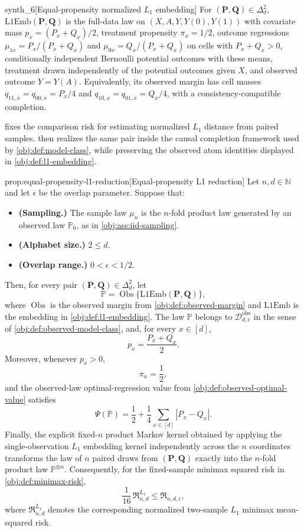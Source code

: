 \begin{definitionv}{synth_6}[Equal-propensity normalized \(L_1\) embedding]
For \((\mathbf P,\mathbf Q)\in\Delta_d^2\), \(\mathrm{L1Emb}(\mathbf P,\mathbf Q)\) is the full-data law on \((X,A,Y,Y(0),Y(1))\) with covariate mass \(p_x=(P_x+Q_x)/2\), treatment propensity \(\pi_x=1/2\), outcome regressions \(\mu_{1x}=P_x/(P_x+Q_x)\) and \(\mu_{0x}=Q_x/(P_x+Q_x)\) on cells with \(P_x+Q_x>0\), conditionally independent Bernoulli potential outcomes with these means, treatment drawn independently of the potential outcomes given \(X\), and observed outcome \(Y=Y(A)\). Equivalently, its observed margin has cell masses \(q_{11,x}=q_{00,x}=P_x/4\) and \(q_{10,x}=q_{01,x}=Q_x/4\), with a consistency-compatible completion.
\end{definitionv}

 fixes the comparison risk for estimating normalized \(L_1\) distance from paired samples.  then realizes the same pair inside the causal completion framework used by \cref{obj:def:model-class}, while preserving the observed atom identities displayed in \cref{obj:def:l1-embedding}.

\begin{propositionv}{prop:equal-propensity-l1-reduction}[Equal-propensity L1 reduction]
Let \(n,d\in\mathbb N\) and let \(\epsilon\) be the overlap parameter. Suppose that:
\begin{itemize}
\item \textbf{(Sampling.)} The sample law \(\mu_n\) is the \(n\)-fold product law generated by an observed law \(\mathbb P_0\), as in \cref{obj:ass:iid-sampling}.
\item \textbf{(Alphabet size.)} \(2\le d\).
\item \textbf{(Overlap range.)} \(0<\epsilon<1/2\).
\end{itemize}
Then, for every pair \((\mathbf P,\mathbf Q)\in\Delta_d^2\), let
\[
\mathbb P=\operatorname{Obs}\{\mathrm{L1Emb}(\mathbf P,\mathbf Q)\},
\]
where \(\operatorname{Obs}\) is the observed margin from \cref{obj:def:observed-margin} and \(\mathrm{L1Emb}\) is the embedding in \cref{obj:def:l1-embedding}. The law \(\mathbb P\) belongs to \(\mathcal D_{d,\epsilon}^{\mathrm{obs}}\) in the sense of \cref{obj:def:observed-model-class}, and, for every \(x\in[d]\),
\[
p_x=\frac{P_x+Q_x}{2}.
\]
Moreover, whenever \(p_x>0\),
\[
\pi_x=\frac12,
\]
and the observed-law optimal-regression value from \cref{obj:def:observed-optimal-value} satisfies
\[
\Psi(\mathbb P)=\frac12+\frac14\sum_{x\in[d]} |P_x-Q_x|.
\]
Finally, the explicit fixed-\(n\) product Markov kernel obtained by applying the single-observation \(L_1\) embedding kernel independently across the \(n\) coordinates transforms the law of \(n\) paired draws from \((\mathbf P,\mathbf Q)\) exactly into the \(n\)-fold product law \(\mathbb P^{\otimes n}\). Consequently, for the fixed-sample minimax squared risk in \cref{obj:def:minimax-risk},
\[
\frac{1}{16}\,\mathfrak R^{L_1}_{n,d}\le \mathfrak R_{n,d,\epsilon},
\]
where \(\mathfrak R^{L_1}_{n,d}\) denotes the corresponding normalized two-sample \(L_1\) minimax mean-squared risk.
\end{propositionv}

